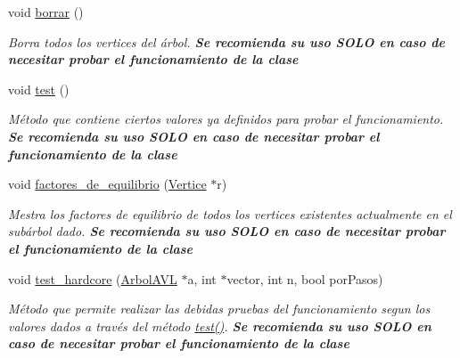 \begin{DoxyCompactItemize}
void \hyperlink{classArbolAVL_ae47585dbdb912214f41eab88eb979e33}{borrar} ()
\begin{DoxyCompactList}\small\item\em Borra todos los vertices del árbol. {\bfseries Se recomienda su uso S\+O\+LO en caso de necesitar probar el funcionamiento de la clase} \end{DoxyCompactList}\item 
void \hyperlink{classArbolAVL_a783a3ffe994d8c2b4069d2fd45afab7f}{test} ()
\begin{DoxyCompactList}\small\item\em Método que contiene ciertos valores ya definidos para probar el funcionamiento. {\bfseries Se recomienda su uso S\+O\+LO en caso de necesitar probar el funcionamiento de la clase} \end{DoxyCompactList}\item 
void \hyperlink{classArbolAVL_ae6341a610967afe9a45c6fcddb68c4c9}{factores\+\_\+de\+\_\+equilibrio} (\hyperlink{classVertice}{Vertice} $\ast$r)
\begin{DoxyCompactList}\small\item\em Mestra los factores de equilibrio de todos los vertices existentes actualmente en el subárbol dado. {\bfseries Se recomienda su uso S\+O\+LO en caso de necesitar probar el funcionamiento de la clase} \end{DoxyCompactList}\item 
void \hyperlink{classArbolAVL_aeb90eb1614513b7438f98a43766d573d}{test\+\_\+hardcore} (\hyperlink{classArbolAVL}{Arbol\+A\+VL} $\ast$a, int $\ast$vector, int n, bool por\+Pasos)
\begin{DoxyCompactList}\small\item\em Método que permite realizar las debidas pruebas del funcionamiento segun los valores dados a través del método \hyperlink{classArbolAVL_a783a3ffe994d8c2b4069d2fd45afab7f}{test()}. {\bfseries Se recomienda su uso S\+O\+LO en caso de necesitar probar el funcionamiento de la clase} \end{DoxyCompactList}\end{DoxyCompactItemize}

